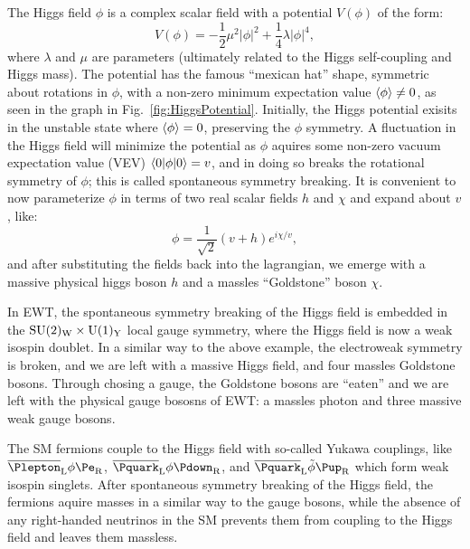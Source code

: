 The Higgs field $\phi$ is a complex scalar field with a potential $V(\phi)$ of the form:
\begin{equation}
    V(\phi) = -\frac{1}{2}\mu^2|\phi|^2 + \frac{1}{4}\lambda|\phi|^4,
\end{equation}
where $\lambda$ and $\mu$ are parameters (ultimately related to the Higgs self-coupling and Higgs mass). The potential has the famous ``mexican hat'' shape, symmetric about rotations in $\phi$, with a non-zero minimum expectation value $\braket{\phi} \neq 0$, as seen in the graph in Fig.~\ref{fig:HiggsPotential}. Initially, the Higgs potential exisits in the unstable state where $\braket{\phi} = 0$, preserving the $\phi$ symmetry. A fluctuation in the Higgs field will minimize the potential as $\phi$ aquires some non-zero vacuum expectation value (VEV) $\braket{0|\phi|0} = v$, and in doing so breaks the rotational symmetry of $\phi$; this is called spontaneous symmetry breaking. It is convenient to now parameterize $\phi$ in terms of two real scalar fields $h$ and $\chi$ and expand about $v$, like:
\begin{equation}
    \phi = \frac{1}{\sqrt{2}}(v+h)e^{i\chi/v},
\end{equation}
and after substituting the fields back into the lagrangian, we emerge with a massive physical higgs boson $h$ and a massles ``Goldstone'' boson $\chi$.

In EWT, the spontaneous symmetry breaking of the Higgs field is embedded in the $\mathrm{SU(2)_{W}}\times\mathrm{U(1)_{Y}}$ local gauge symmetry, where the Higgs field is now a weak isospin doublet. In a similar way to the above example, the electroweak symmetry is broken, and we are left with a massive Higgs field, and four massles Goldstone bosons. Through chosing a gauge, the Goldstone bosons are ``eaten'' and we are left with the physical gauge bososns of EWT: a massles photon and three massive weak gauge bosons. 

The SM fermions couple to the Higgs field with so-called Yukawa couplings, like $\antispinor{\Plepton}{L}{}\phi\spinor{\Pe}{R}{}$, $\antispinor{\Pquark}{L}{}\phi\spinor{\Pdown}{R}{}$, and $\antispinor{\Pquark}{L}{}\tilde{\phi}\spinor{\Pup}{R}{}$ which form weak isospin singlets. After spontaneous symmetry breaking of the Higgs field, the fermions aquire masses in a similar way to the gauge bosons, while the absence of any right-handed neutrinos in the SM prevents them from coupling to the Higgs field and leaves them massless.

